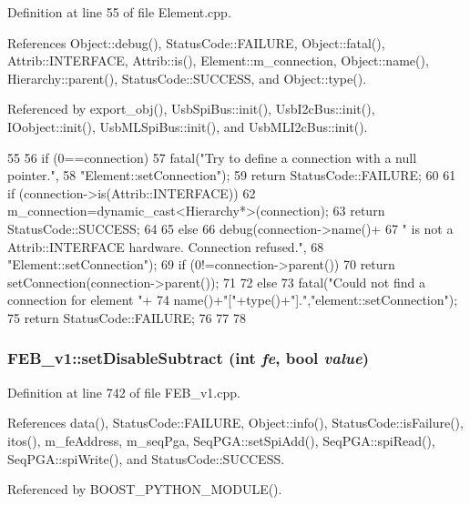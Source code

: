 Definition at line 55 of file Element.cpp.

References Object::debug(), StatusCode::FAILURE, Object::fatal(), Attrib::INTERFACE, Attrib::is(), Element::m\_\-connection, Object::name(), Hierarchy::parent(), StatusCode::SUCCESS, and Object::type().

Referenced by export\_\-obj(), UsbSpiBus::init(), UsbI2cBus::init(), IOobject::init(), UsbMLSpiBus::init(), and UsbMLI2cBus::init().


\begin{DoxyCode}
55                                                       {
56   if (0==connection){
57     fatal("Try to define a connection with a null pointer.",
58         "Element::setConnection");
59     return StatusCode::FAILURE;
60   }
61   if (connection->is(Attrib::INTERFACE)){
62     m_connection=dynamic_cast<Hierarchy*>(connection);
63     return StatusCode::SUCCESS;
64   }
65   else {
66     debug(connection->name()+
67         " is not a Attrib::INTERFACE hardware. Connection refused.",
68         "Element::setConnection");
69     if (0!=connection->parent()){
70       return setConnection(connection->parent());
71     }
72     else{
73       fatal("Could not find a connection for element "+
74           name()+"["+type()+"].","element::setConnection");
75       return StatusCode::FAILURE;
76     }
77   }
78 }
\end{DoxyCode}
\hypertarget{classFEB__v1_a067a0aeae34dbd782547afbcd82fc77f}{
\subsubsection[{setDisableSubtract}]{ FEB\_\-v1::setDisableSubtract (int {\em fe}, \/  bool {\em value})}}
\label{classFEB__v1_a067a0aeae34dbd782547afbcd82fc77f}


Definition at line 742 of file FEB\_\-v1.cpp.

References data(), StatusCode::FAILURE, Object::info(), StatusCode::isFailure(), itos(), m\_\-feAddress, m\_\-seqPga, SeqPGA::setSpiAdd(), SeqPGA::spiRead(), SeqPGA::spiWrite(), and StatusCode::SUCCESS.

Referenced by BOOST\_\-PYTHON\_\-MODULE().


